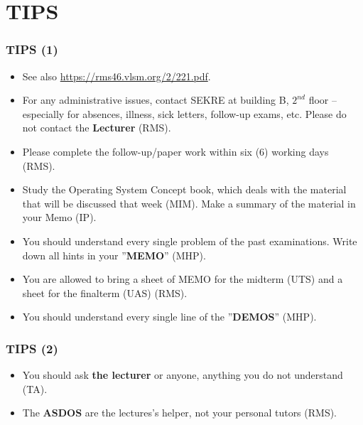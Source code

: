 
\section{TIPS}

\begin{frame}[fragile]
\frametitle{TIPS (1)}

\begin{itemize}

\item See also \url{https://rms46.vlsm.org/2/221.pdf}.

\item For any administrative issues, contact SEKRE at building B, $2^{nd}$ floor --
      especially for absences, illness, sick letters, follow-up exams, etc.
      Please do not contact the \textbf{Lecturer} (RMS).

\item Please complete the follow-up/paper work within six (6) working days (RMS).

\item Study the Operating System Concept book, which deals with the material that
      will be discussed that week (MIM). Make a summary of the material in your Memo (IP).

\item You should understand every single problem of the past examinations.
      Write down all hints in your ''\textbf{MEMO}'' (MHP).

\item You are allowed to bring a sheet of MEMO for the midterm (UTS) and
     a sheet for the finalterm (UAS) (RMS).

\item You should understand every single line of the ''\textbf{DEMOS}'' (MHP).

\end{itemize}

\end{frame}

\begin{frame}[fragile]
\frametitle{TIPS (2)}

\begin{itemize}

\item You should ask \textbf{the lecturer} or anyone, anything you do not understand (TA).

\item The \textbf{ASDOS} are the lectures's helper, not your personal tutors (RMS).

\end{itemize}

\end{frame}

